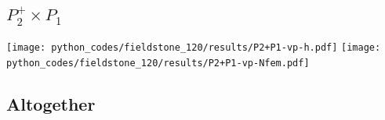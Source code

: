 \subsection*{$P_2^+\times P_{1}$}
\begin{center}
\texttt{[image: python\_codes/fieldstone\_120/results/P2+P1-vp-h.pdf]}
\texttt{[image: python\_codes/fieldstone\_120/results/P2+P1-vp-Nfem.pdf]}
\end{center}





\newpage
\subsection*{Altogether}


